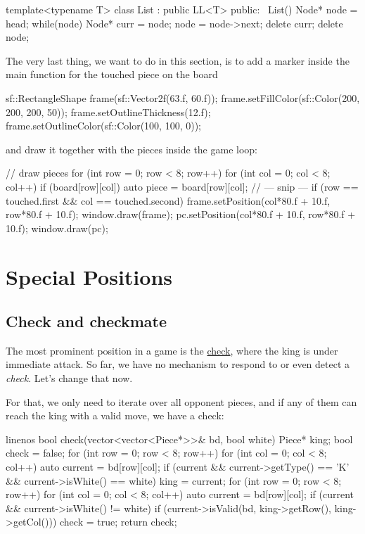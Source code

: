\begin{cpp}
template<typename T>
class List : public LL<T> {
public:
  ~List() {
    Node* node = head;
    while(node) {
      Node* curr = node;
      node = node->next;
      delete curr;
    }
    delete node;
  }
}
\end{cpp}

The very last thing, we want to do in this section, is to add a marker inside the main function for the
touched piece on the board

\begin{cpp}
sf::RectangleShape frame(sf::Vector2f(63.f, 60.f));
frame.setFillColor(sf::Color(200, 200, 200, 50));
frame.setOutlineThickness(12.f);
frame.setOutlineColor(sf::Color(100, 100, 0));
\end{cpp}

and draw it together with the pieces inside the game loop:

\begin{cpp}
// draw pieces
for (int row = 0; row < 8; row++) {
  for (int col = 0; col < 8; col++) {
    if (board[row][col]) {
      auto piece = board[row][col];
      // --- snip ---
      if (row == touched.first && col == touched.second) {
        frame.setPosition(col*80.f + 10.f, row*80.f + 10.f);
        window.draw(frame);
      }
      pc.setPosition(col*80.f + 10.f, row*80.f + 10.f);
      window.draw(pc);
    }
  }
}
\end{cpp}

\section{Special Positions}\label{sec:specpos}
\subsection{Check and checkmate}

The most prominent position in a game is the \href{https://en.wikipedia.org/wiki/Check_(chess)}{check},
where the king is under immediate attack.
So far, we have no mechanism to respond to or even detect a \emph{check}.
Let's change that now.

For that, we only need to iterate over all opponent pieces, and if any of them can reach the king
with a valid move, we have a check:

\begin{cpp*}{linenos}
bool check(vector<vector<Piece*>>& bd, bool white) {
  Piece* king;
  bool check = false;
  for (int row = 0; row < 8; row++) {
    for (int col = 0; col < 8; col++) {
      auto current = bd[row][col];
      if (current && current->getType() == 'K' &&
          current->isWhite() == white)
      {
        king = current;
      }
    }
  }
  for (int row = 0; row < 8; row++) {
    for (int col = 0; col < 8; col++) {
      auto current = bd[row][col];
      if (current && current->isWhite() != white) {
        if (current->isValid(bd, king->getRow(), king->getCol())) {
          check = true;
        }
      }
    }
  }
  return check;
}
\end{cpp*}

